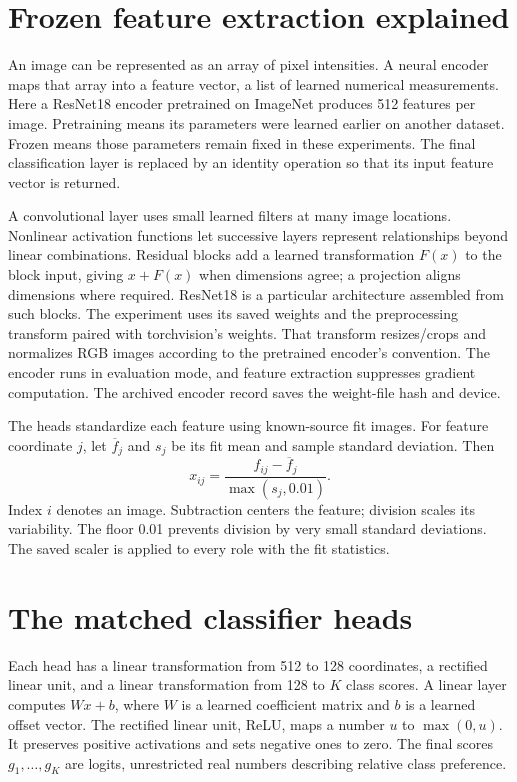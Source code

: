 \documentclass[11pt,a4paper]{report}
\newcommand{\code}[1]{\texttt{\detokenize{#1}}}
\begin{document}
\section{Frozen feature extraction explained}
An image can be represented as an array of pixel intensities. A neural encoder maps that array into a feature vector, a list of learned numerical measurements. Here a ResNet18 encoder pretrained on ImageNet produces 512 features per image. Pretraining means its parameters were learned earlier on another dataset. Frozen means those parameters remain fixed in these experiments. The final classification layer is replaced by an identity operation so that its input feature vector is returned.

A convolutional layer uses small learned filters at many image locations. Nonlinear activation functions let successive layers represent relationships beyond linear combinations. Residual blocks add a learned transformation $F(x)$ to the block input, giving $x+F(x)$ when dimensions agree; a projection aligns dimensions where required. ResNet18 is a particular architecture assembled from such blocks. The experiment uses its saved weights and the preprocessing transform paired with torchvision's \code{IMAGENET1K_V1} weights. That transform resizes/crops and normalizes RGB images according to the pretrained encoder's convention. The encoder runs in evaluation mode, and feature extraction suppresses gradient computation. The archived encoder record saves the weight-file hash and device.

The heads standardize each feature using known-source fit images. For feature coordinate $j$, let $\overline f_j$ and $s_j$ be its fit mean and sample standard deviation. Then
\begin{equation}
x_{ij}=\frac{f_{ij}-\overline f_j}{\max(s_j,0.01)}.
\end{equation}
Index $i$ denotes an image. Subtraction centers the feature; division scales its variability. The floor 0.01 prevents division by very small standard deviations. The saved scaler is applied to every role with the fit statistics.

\section{The matched classifier heads}
Each head has a linear transformation from 512 to 128 coordinates, a rectified linear unit, and a linear transformation from 128 to $K$ class scores. A linear layer computes $Wx+b$, where $W$ is a learned coefficient matrix and $b$ is a learned offset vector. The rectified linear unit, ReLU, maps a number $u$ to $\max(0,u)$. It preserves positive activations and sets negative ones to zero. The final scores $g_1,\ldots,g_K$ are logits, unrestricted real numbers describing relative class preference.
\end{document}
